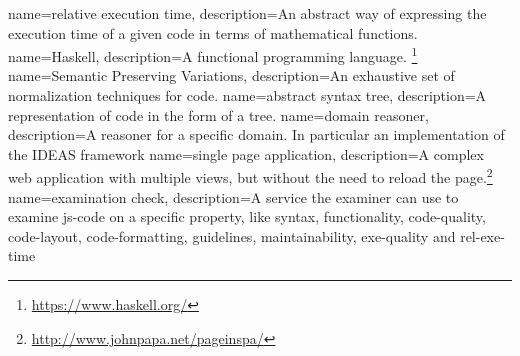 {
  name=relative execution time,
  description={An abstract way of expressing the execution time
    of a given \gls{code} in terms of mathematical functions.}
}
{
  name=Haskell,
  description={A functional programming language.
  \footnote{\url{https://www.haskell.org/}}}
}
{
  name=Semantic Preserving Variations,
  description={An exhaustive set of normalization techniques for \gls{code}.}
}
{
  name=abstract syntax tree,
  description={A representation of \gls{code} in the form of a tree.}
}
{
  name=domain reasoner,
  description={A reasoner for a specific domain. In particular an implementation
    of the IDEAS framework}
}
{
  name=single page application,
  description={A complex web application with multiple views,
    but without the need to reload
    the page.\footnote{\url{http://www.johnpapa.net/pageinspa/}}}
}
{
  name=examination check,
  description={A service the \gls{examiner} can use
    to examine \gls{js-code} on a specific property,
    like \gls{syntax}, \gls{functionality}, \gls{code-quality},
    \gls{code-layout}, \gls{code-formatting}, \gls{guidelines},
    \gls{maintainability}, \gls{exe-quality}
    and \gls{rel-exe-time}}
}
